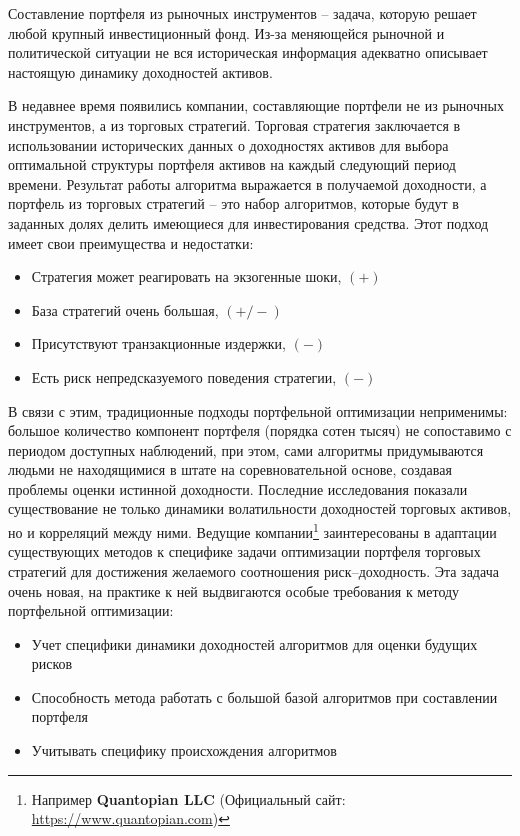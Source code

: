 Составление портфеля из рыночных инструментов -- задача, которую решает любой крупный инвестиционный фонд. Из-за меняющейся рыночной и политической ситуации не вся историческая информация адекватно описывает настоящую динамику доходностей активов.

В недавнее время появились компании, составляющие портфели не из рыночных инструментов, а из торговых стратегий. Торговая стратегия заключается в использовании исторических данных о доходностях активов для выбора оптимальной структуры портфеля активов на каждый следующий период времени. Результат работы алгоритма выражается в получаемой доходности, а портфель из торговых стратегий -- это набор алгоритмов, которые будут в заданных долях делить имеющиеся для инвестирования средства.
Этот подход имеет свои преимущества и недостатки: 
\begin{itemize}
	\item Стратегия может реагировать на экзогенные шоки, $(+)$
	\item База стратегий очень большая, $(+/-)$ 
	\item Присутствуют транзакционные издержки, $(-)$
	\item Есть риск непредсказуемого поведения стратегии, $(-)$
\end{itemize}

В связи с этим, традиционные подходы портфельной оптимизации неприменимы: большое количество компонент портфеля (порядка сотен тысяч) не сопоставимо с периодом доступных наблюдений, при этом, сами алгоритмы придумываются людьми не находящимися в штате на соревновательной основе, создавая проблемы оценки истинной доходности. Последние исследования показали существование не только динамики волатильности доходностей торговых активов, но и корреляций между ними. Ведущие компании\footnote{Например \textbf{Quantopian LLC} (Официальный сайт: \href{https://www.quantopian.com}{https://www.quantopian.com})} заинтересованы в адаптации существующих методов к специфике задачи оптимизации портфеля торговых стратегий для достижения желаемого соотношения риск--доходность. Эта задача очень новая, на практике к ней выдвигаются особые требования к методу портфельной оптимизации:
\begin{itemize}
	\item Учет специфики динамики доходностей алгоритмов для оценки будущих рисков
	\item Способность метода работать с большой базой алгоритмов при составлении портфеля
	\item Учитывать специфику происхождения алгоритмов
\end{itemize}

